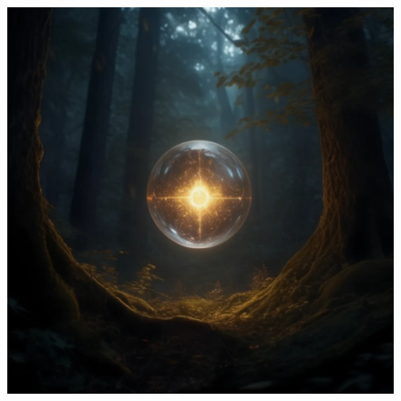 


\begin{figure}[h]
\begin{center}
\includegraphics[scale=0.24]{img/ai-images/healing-spirit.png}
\end{center}
\end{figure}
